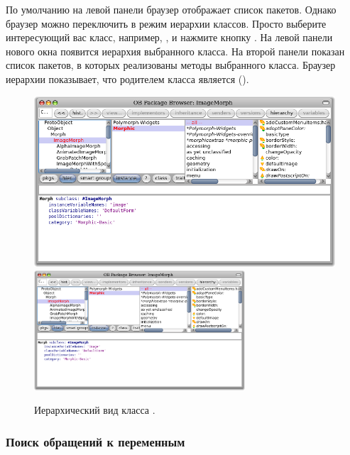 \documentclass[a4paper,10pt,twoside]{book}
\begin{document}
По умолчанию на левой панели браузер отображает список пакетов. Однако браузер можно переключить в режим иерархии классов. Просто выберите интересующий вас класс, например, , и нажмите кнопку . На левой панели нового окна появится иерархия выбранного класса. На второй панели показан список пакетов, в которых реализованы методы выбранного класса. Браузер иерархии показывает, что родителем класса  является  ().

\begin{figure}[btp]
	\begin{center}
	\ifluluelse
		{\includegraphics[width=\textwidth]{hierarchyBrowser}}
		{\includegraphics[width=0.7\textwidth]{hierarchyBrowser}}
	\end{center}
	\caption{Иерархический вид класса .}
\end{figure}

\subsubsection{Поиск обращений к переменным}
\end{document}
